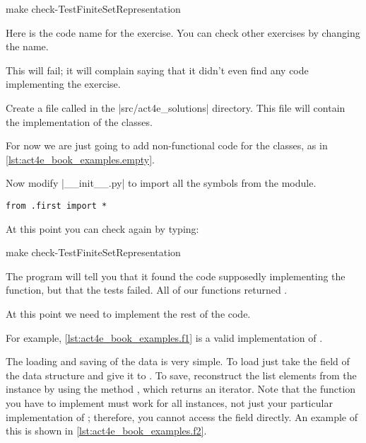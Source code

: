\begin{console}
  make check-TestFiniteSetRepresentation
\end{console}

Here  is the code name for the exercise. You can check other exercises by changing the name.

This will fail; it will complain saying that it didn't even find any code implementing the exercise.


Create a file called  in the \files|src/act4e_solutions| directory.
This file will contain the implementation of the classes.

For now we are just going to add non-functional code for the classes,
as in \cref{lst:act4e_book_examples.empty}.

\begin{longcode}
  \caption{}

  \label{lst:act4e_book_examples.empty}
\end{longcode}

Now modify \files|__init__.py| to import all the symbols from the  module.

\begin{verbatim}
from .first import *
\end{verbatim}

At this point you can check again by typing:

\begin{console}
  make check-TestFiniteSetRepresentation
\end{console}

The program will tell you that it found the code supposedly implementing the function,
but that the tests failed. All of our functions returned .

At this point we need to implement the rest of the code.

For example, \cref{lst:act4e_book_examples.f1} is a valid implementation of \FiniteSet.

\begin{longcode}
  \caption{}
  \label{lst:act4e_book_examples.f1}
\end{longcode}

The loading and saving of the data is very simple.
To load just take the  field of the data structure and give it to .
To save, reconstruct the list elements from the  instance by using the method , which returns an iterator.
Note that the  function you have to implement must work for all \FiniteSet instances, not just your particular implementation of \FiniteSet; therefore, you cannot access the  field directly.
An example of this is shown in \cref{lst:act4e_book_examples.f2}.

